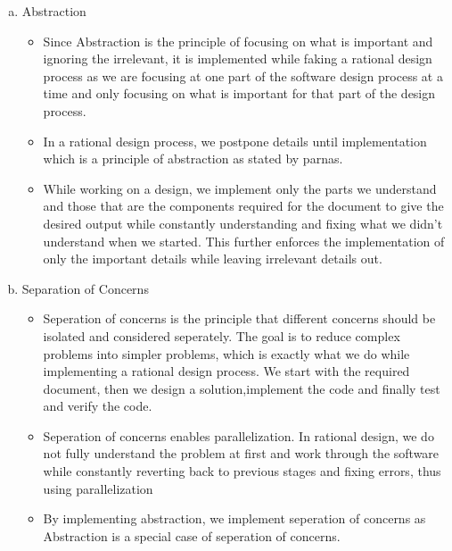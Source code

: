 \documentclass[12pt,fleqn]{examtst}
\begin{document}
\begin{enumerate}[a)]
\item Abstraction
  \begin{itemize}
  \item Since Abstraction is the principle of focusing on what is important and ignoring the irrelevant, it is implemented while faking
  a rational design process as we are focusing at one part of the software design process at a time and only focusing on what is important
  for that part of the design process.

  \item In a rational design process, we postpone details until implementation which is a principle of abstraction as stated by parnas.

  \item While working on a design, we implement only the parts we understand and those that are the components required for the document to give the 
  desired output while constantly understanding and fixing what we didn't understand when we started. This further enforces the implementation
  of only the important details while leaving irrelevant details out.

  \end{itemize}
\item Separation of Concerns
  \begin{itemize}
  \item Seperation of concerns is the principle that different concerns should be isolated and considered seperately. The goal is to reduce
  complex problems into simpler problems, which is exactly what we do while implementing a rational design process. We start with the required
  document, then we design a solution,implement the code and finally test and verify the code.

  \item Seperation of concerns enables parallelization. In rational design, we do not fully understand the problem at first and work through
  the software while constantly reverting back to previous stages and fixing errors, thus using parallelization

  \item By implementing abstraction, we implement seperation of concerns as Abstraction is a special case of seperation of concerns.

  \end{itemize}
\end{enumerate}

\end{document}
